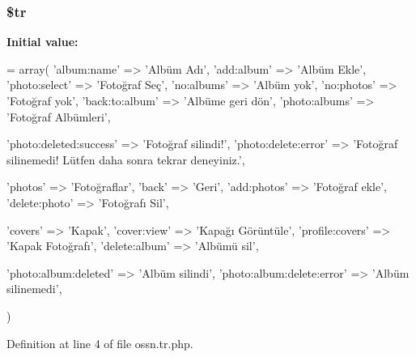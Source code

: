\subsubsection[{\texorpdfstring{\$tr}{$tr}}]{\setlength{\rightskip}{0pt plus 5cm}\$tr}\hypertarget{components_2_ossn_photos_2locale_2ossn_8tr_8php_a925f466a276b200c71b2567d39b4dba7}{}\label{components_2_ossn_photos_2locale_2ossn_8tr_8php_a925f466a276b200c71b2567d39b4dba7}
{\bfseries Initial value\+:}
\begin{DoxyCode}
= array(
    \textcolor{stringliteral}{'album:name'} => \textcolor{stringliteral}{'Albüm Adı'},
    \textcolor{stringliteral}{'add:album'} => \textcolor{stringliteral}{'Albüm Ekle'},
    \textcolor{stringliteral}{'photo:select'} => \textcolor{stringliteral}{'Fotoğraf Seç'},
    \textcolor{stringliteral}{'no:albums'} => \textcolor{stringliteral}{'Albüm yok'},
    \textcolor{stringliteral}{'no:photos'} => \textcolor{stringliteral}{'Fotoğraf yok'},
    \textcolor{stringliteral}{'back:to:album'} => \textcolor{stringliteral}{'Albüme geri dön'},
    \textcolor{stringliteral}{'photo:albums'} => \textcolor{stringliteral}{'Fotoğraf Albümleri'},
    
    \textcolor{stringliteral}{'photo:deleted:success'} => \textcolor{stringliteral}{'Fotoğraf silindi!'},
    \textcolor{stringliteral}{'photo:delete:error'} => \textcolor{stringliteral}{'Fotoğraf silinemedi! Lütfen daha sonra tekrar deneyiniz.'},
    
    \textcolor{stringliteral}{'photos'} => \textcolor{stringliteral}{'Fotoğraflar'},
    \textcolor{stringliteral}{'back'} => \textcolor{stringliteral}{'Geri'},
    \textcolor{stringliteral}{'add:photos'} => \textcolor{stringliteral}{'Fotoğraf ekle'},
    \textcolor{stringliteral}{'delete:photo'} => \textcolor{stringliteral}{'Fotoğrafı Sil'},
    
    \textcolor{stringliteral}{'covers'} => \textcolor{stringliteral}{'Kapak'},
    \textcolor{stringliteral}{'cover:view'} => \textcolor{stringliteral}{'Kapağı Görüntüle'},
    \textcolor{stringliteral}{'profile:covers'} => \textcolor{stringliteral}{'Kapak Fotoğrafı'},
    \textcolor{stringliteral}{'delete:album'} => \textcolor{stringliteral}{'Albümü sil'},
    
    \textcolor{stringliteral}{'photo:album:deleted'} => \textcolor{stringliteral}{'Albüm silindi'},
    \textcolor{stringliteral}{'photo:album:delete:error'} => \textcolor{stringliteral}{'Albüm silinemedi'},
    

)
\end{DoxyCode}


Definition at line 4 of file ossn.\+tr.\+php.

